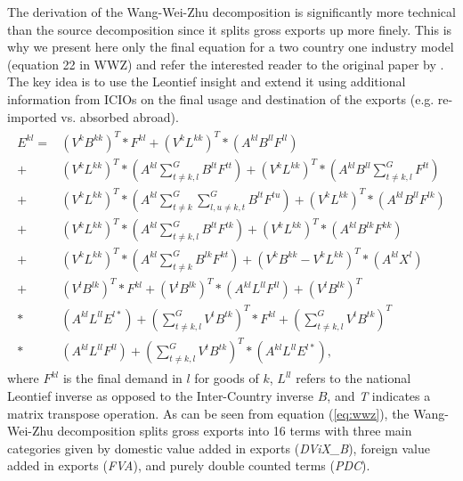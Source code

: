 \documentclass[a4paper]{article}\usepackage[]{graphicx}\usepackage[]{color}
\begin{document}
The derivation of the Wang-Wei-Zhu decomposition is significantly more technical than the source decomposition since it splits gross exports up more finely.
This is why we present here only the final equation for a two country one industry model (equation 22 in WWZ) and refer the interested reader to the original paper by \textcite{wang2014quantifying}.
The key idea is to use the Leontief insight and extend it using additional information from ICIOs on the final usage and destination of the exports (e.g. re-imported vs. absorbed abroad).
\begin{align}
\label{eq:wwz}
\begin{split}
E^{kl}
= &\left(V^k B^{kk} \right)^T * F^{kl} 
+ \left(V^k L^{kk} \right)^T * \left(A^{kl} B^{ll} F^{ll} \right)\\
+& \left(V^k L^{kk} \right)^T * (A^{kl} \sum_{t \neq k,l}^G  B^{lt} F^{tt} )
+ \left(V^k L^{kk} \right)^T *  (A^{kl} B^{ll} \sum_{t \neq k,l}^G  F^{lt} )\\ 
+&  \left(V^k L^{kk} \right)^T * (A^{kl} \sum_{t \neq k}^G \sum_{l,u \neq k,t}^G B^{lt} F^{tu} )
+ \left(V^k L^{kk} \right)^T * \left(A^{kl} B^{ll} F^{lk} \right)\\
+& \left(V^k L^{kk} \right)^T * (A^{kl} \sum_{t \neq k,l}^G  B^{lt} F^{tk} )
+ \left(V^k L^{kk} \right)^T * \left(A^{kl} B^{lk} F^{kk} \right) \\
+& \left(V^k L^{kk} \right)^T * (A^{kl} \sum_{t \neq k}^G  B^{lk} F^{kt} )
+ \left(V^k B^{kk} -  V^k L^{kk} \right)^T * \left(A^{kl} X^{l}  \right)\\
+& \left(V^l B^{lk} \right)^T * F^{kl}
+ \left(V^l B^{lk} \right)^T *  \left(A^{kl} L^{ll} F^{ll} \right)
+ \left(V^l B^{lk} \right)^T \\
*&  \left(A^{kl} L^{ll} E^{l*} \right) + (\sum_{t \neq k,l}^G  V^{t} B^{tk} )^{T} * F^{kl}
+ (\sum_{t \neq k,l}^G  V^{t} B^{tk} )^{T}\\
*&   \left(A^{kl} L^{ll} F^{ll} \right) + (\sum_{t \neq k,l}^G  V^{t} B^{tk} )^{T} *  \left(A^{kl} L^{ll} E^{l*} \right) ,
\end{split}
\end{align}
where $F^{kl}$ is the final demand in $l$ for goods of $k$, 
$L^{ll}$ refers to the national Leontief inverse as opposed to the Inter-Country inverse $B$, 
and \textit{T} indicates a matrix transpose operation. 
As can be seen from equation (\ref{eq:wwz}), 
the Wang-Wei-Zhu decomposition splits gross exports into 16 terms with three main categories given by domestic value added in exports (\textit{DViX\_B}), foreign value added in exports (\textit{FVA}), and purely double counted terms (\textit{PDC}). 
\end{document}
